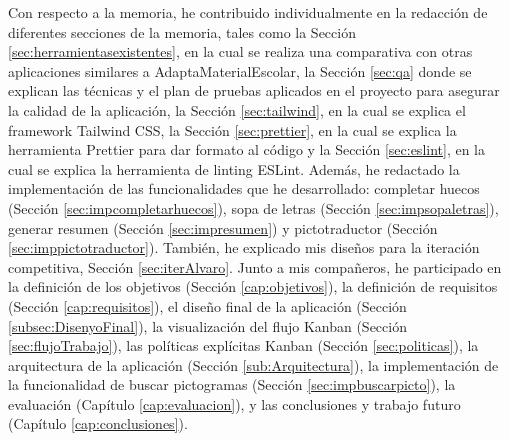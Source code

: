 Con respecto a la memoria, he contribuido individualmente en la redacción de diferentes secciones de la memoria, tales como la Sección \ref{sec:herramientasexistentes}, en la cual se realiza una comparativa con otras aplicaciones similares a AdaptaMaterialEscolar, la Sección \ref{sec:qa} donde se explican las técnicas y el plan de pruebas aplicados en el proyecto para asegurar la calidad de la aplicación, la Sección \ref{sec:tailwind}, en la cual se explica el framework Tailwind CSS, la Sección \ref{sec:prettier}, en la cual se explica la herramienta Prettier para dar formato al código y la Sección \ref{sec:eslint}, en la cual se explica la herramienta de linting ESLint. Además, he redactado la implementación de las funcionalidades que he desarrollado: completar huecos (Sección \ref{sec:impcompletarhuecos}), sopa de letras (Sección \ref{sec:impsopaletras}), generar resumen (Sección \ref{sec:impresumen}) y pictotraductor (Sección \ref{sec:imppictotraductor}). También, he explicado mis diseños para la iteración competitiva, Sección \ref{sec:iterAlvaro}. Junto a mis compañeros, he participado en la definición de los objetivos (Sección \ref{cap:objetivos}), la definición de requisitos (Sección \ref{cap:requisitos}), el diseño final de la aplicación (Sección \ref{subsec:DisenyoFinal}), la visualización del flujo Kanban (Sección \ref{sec:flujoTrabajo}), las políticas explícitas Kanban (Sección \ref{sec:politicas}), la arquitectura de la aplicación (Sección \ref{sub:Arquitectura}), la implementación de la funcionalidad de buscar pictogramas (Sección \ref{sec:impbuscarpicto}), la evaluación (Capítulo \ref{cap:evaluacion}), y las conclusiones y trabajo futuro (Capítulo \ref{cap:conclusiones}).

